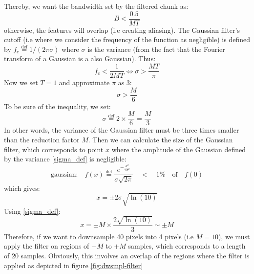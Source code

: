 \documentclass[11pt]{report}
\begin{document}
Thereby, we want the bandwidth set by the filtered chunk as:
\begin{equation}
B < \frac{0.5}{MT}
\end{equation}
otherwise, the features will overlap (i.e creating aliasing). The Gaussian filter's cutoff (i.e where we consider the frequency of the function as negligible) is defined by $f_c \stackrel{\text{def}}{=} 1/(2\pi \sigma)$ where $\sigma$ is the variance (from the fact that the Fourier transform of a Gaussian is a also Gaussian). Thus:
\begin{equation}
f_c < \frac{1}{2MT} \Leftrightarrow \sigma > \frac{MT}{\pi}
\end{equation}
Now we set $T=1$ and approximate $\pi$ as 3:
\begin{equation}
\sigma > \frac{M}{6}
\end{equation}
To be sure of the inequality, we set:
\begin{equation}
\label{sigma_def}
\sigma \stackrel{\text{def}}{=} 2\times\frac{M}{6} = \frac{M}{3}
\end{equation}
In other words, the variance of the Gaussian filter must be three times smaller than the reduction factor $M$. Then we can calculate the size of the Gaussian filter, which corresponds to point $x$ where the amplitude of the Gaussian defined by the variance \eqref{sigma_def} is negligible:
\begin{equation}
\textrm{gaussian:} \quad f(x) \stackrel{\text{def}}{=} \frac{e^{-\frac{x^2}{2\sigma^2}}}{\sigma\sqrt{2\pi}} \quad < \quad 1\% \quad \textrm{of} \quad f(0)
\end{equation}
which gives:
\begin{equation}
x = \pm 2\sigma\sqrt{\ln(10)}
\end{equation}
Using \eqref{sigma_def}:
\begin{equation}
x = \pm M \times \frac{2\sqrt{\ln(10)}}{3} \sim \pm M
\end{equation}
Therefore, if we want to downsample 40 pixels into 4 pixels (i.e $M = 10$), we must apply the filter on regions of $-M$ to $+M$ samples, which corresponds to a length of $20$ samples. Obviously, this involves an overlap of the regions where the filter is applied as depicted in figure \ref{fig:dwsmpl-filter}
\end{document}
